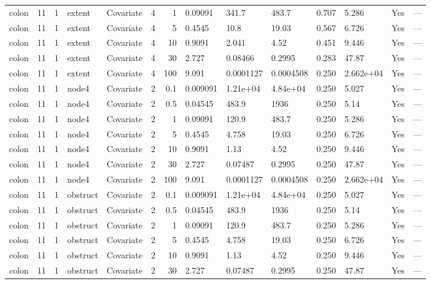 \begin{tabular}{lrlllrrlllllll}
  colon & 11 & 1 & extent & Covariate & 4 &     1 & 0.09091 & 341.7 & 483.7 & 0.707 & 5.286 & Yes & --- \\ 
  colon & 11 & 1 & extent & Covariate & 4 &     5 & 0.4545 & 10.8 & 19.03 & 0.567 & 6.726 & Yes & --- \\ 
  colon & 11 & 1 & extent & Covariate & 4 &    10 & 0.9091 & 2.041 & 4.52 & 0.451 & 9.446 & Yes & --- \\ 
  colon & 11 & 1 & extent & Covariate & 4 &    30 & 2.727 & 0.08466 & 0.2995 & 0.283 & 47.87 & Yes & --- \\ 
  colon & 11 & 1 & extent & Covariate & 4 &   100 & 9.091 & 0.0001127 & 0.0004508 & 0.250 & 2.662e+04 & Yes & --- \\ 
  colon & 11 & 1 & node4 & Covariate & 2 &   0.1 & 0.009091 & 1.21e+04 & 4.84e+04 & 0.250 & 5.027 & Yes & --- \\ 
  colon & 11 & 1 & node4 & Covariate & 2 &   0.5 & 0.04545 & 483.9 & 1936 & 0.250 & 5.14 & Yes & --- \\ 
  colon & 11 & 1 & node4 & Covariate & 2 &     1 & 0.09091 & 120.9 & 483.7 & 0.250 & 5.286 & Yes & --- \\ 
  colon & 11 & 1 & node4 & Covariate & 2 &     5 & 0.4545 & 4.758 & 19.03 & 0.250 & 6.726 & Yes & --- \\ 
  colon & 11 & 1 & node4 & Covariate & 2 &    10 & 0.9091 & 1.13 & 4.52 & 0.250 & 9.446 & Yes & --- \\ 
  colon & 11 & 1 & node4 & Covariate & 2 &    30 & 2.727 & 0.07487 & 0.2995 & 0.250 & 47.87 & Yes & --- \\ 
  colon & 11 & 1 & node4 & Covariate & 2 &   100 & 9.091 & 0.0001127 & 0.0004508 & 0.250 & 2.662e+04 & Yes & --- \\ 
  colon & 11 & 1 & obstruct & Covariate & 2 &   0.1 & 0.009091 & 1.21e+04 & 4.84e+04 & 0.250 & 5.027 & Yes & --- \\ 
  colon & 11 & 1 & obstruct & Covariate & 2 &   0.5 & 0.04545 & 483.9 & 1936 & 0.250 & 5.14 & Yes & --- \\ 
  colon & 11 & 1 & obstruct & Covariate & 2 &     1 & 0.09091 & 120.9 & 483.7 & 0.250 & 5.286 & Yes & --- \\ 
  colon & 11 & 1 & obstruct & Covariate & 2 &     5 & 0.4545 & 4.758 & 19.03 & 0.250 & 6.726 & Yes & --- \\ 
  colon & 11 & 1 & obstruct & Covariate & 2 &    10 & 0.9091 & 1.13 & 4.52 & 0.250 & 9.446 & Yes & --- \\ 
  colon & 11 & 1 & obstruct & Covariate & 2 &    30 & 2.727 & 0.07487 & 0.2995 & 0.250 & 47.87 & Yes & --- \\ 

\end{tabular}

